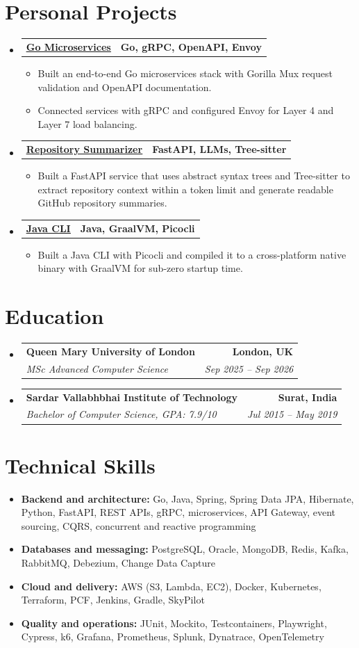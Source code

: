 \documentclass[a4paper,10pt]{article}
\makeatletter
\newcommand{\cvLink}[2]{\href{#1}{\underline{#2}}}
\newcommand{\resumeItem}[1]{\item\small #1}
\newcommand{\resumeSubheading}[4]{
  \item[]
  \begin{tabular*}{\textwidth}{l@{\extracolsep{\fill}}r}
    \textbf{#1} & \textbf{\small #2} \\
    \textit{\small #3} & \textit{\small #4}
  \end{tabular*}\vspace{-3pt}
}
\newcommand{\resumeProjectHeading}[2]{
  \item[]
  \begin{tabular*}{\textwidth}{l@{\extracolsep{\fill}}r}
    \textbf{#1} & \textbf{\small #2}
  \end{tabular*}\vspace{-4pt}
}
\newcommand{\resumeSubHeadingListStart}{\begin{itemize}[leftmargin=0pt,label={},itemsep=1pt,topsep=1pt]}
\newcommand{\resumeSubHeadingListEnd}{\end{itemize}}
\newcommand{\resumeItemListStart}{\begin{itemize}[leftmargin=14pt,itemsep=1.4pt,topsep=2pt,parsep=0pt]}
\newcommand{\resumeItemListEnd}{\end{itemize}\vspace{1pt}}
\makeatother
\begin{document}
\section{Personal Projects}
\resumeSubHeadingListStart
  \resumeProjectHeading{\cvLink{https://github.com/aymanapatel/golang-microservices}{Go Microservices}}{Go, gRPC, OpenAPI, Envoy}
  \resumeItemListStart
    \resumeItem{Built an end-to-end Go microservices stack with Gorilla Mux request validation and OpenAPI documentation.}
    \resumeItem{Connected services with gRPC and configured Envoy for Layer 4 and Layer 7 load balancing.}
  \resumeItemListEnd

  \resumeProjectHeading{\cvLink{https://github.com/aymanapatel/nebius-project}{Repository Summarizer}}{FastAPI, LLMs, Tree-sitter}
  \resumeItemListStart
    \resumeItem{Built a FastAPI service that uses abstract syntax trees and Tree-sitter to extract repository context within a token limit and generate readable GitHub repository summaries.}
  \resumeItemListEnd

  \resumeProjectHeading{\cvLink{https://github.com/aymanapatel/java-cli}{Java CLI}}{Java, GraalVM, Picocli}
  \resumeItemListStart
    \resumeItem{Built a Java CLI with Picocli and compiled it to a cross-platform native binary with GraalVM for sub-zero startup time.}
  \resumeItemListEnd
\resumeSubHeadingListEnd

\section{Education}
\resumeSubHeadingListStart
  \resumeSubheading{Queen Mary University of London}{London, UK}{MSc Advanced Computer Science}{Sep 2025 -- Sep 2026}
  \resumeSubheading{Sardar Vallabhbhai Institute of Technology}{Surat, India}{Bachelor of Computer Science, GPA: 7.9/10}{Jul 2015 -- May 2019}
\resumeSubHeadingListEnd

\section{Technical Skills}
\begin{itemize}[leftmargin=0pt,label={},itemsep=2pt,topsep=1pt]
  \small
  \item \textbf{Backend and architecture:} Go, Java, Spring, Spring Data JPA, Hibernate, Python, FastAPI, REST APIs, gRPC, microservices, API Gateway, event sourcing, CQRS, concurrent and reactive programming
  \item \textbf{Databases and messaging:} PostgreSQL, Oracle, MongoDB, Redis, Kafka, RabbitMQ, Debezium, Change Data Capture
  \item \textbf{Cloud and delivery:} AWS (S3, Lambda, EC2), Docker, Kubernetes, Terraform, PCF, Jenkins, Gradle, SkyPilot
  \item \textbf{Quality and operations:} JUnit, Mockito, Testcontainers, Playwright, Cypress, k6, Grafana, Prometheus, Splunk, Dynatrace, OpenTelemetry
\end{itemize}
\end{document}
